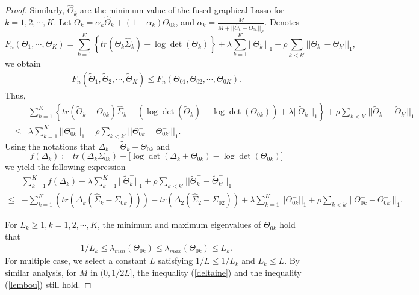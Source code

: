 \documentclass[review]{elsarticle}
\newcommand{\1}{{\bf 1}}
\newcommand{\0}{{\bf 0}}
\newcommand{\bqa}{\begin{eqnarray}}
\newcommand{\eqa}{\end{eqnarray}}
\newcommand{\non}{\nonumber\\}
\newtheorem{proof}{Proof}
\begin{document}
\begin{appendices}
\begin{proof}
 Similarly, $\widehat{\Theta}_k$ are the minimum value of the fused graphical Lasso for $k=1,2,\cdots,K$. Let $\widetilde{\Theta}_k=\alpha_k\widehat{\Theta}_k+(1-\alpha_k)\Theta_{0k}$, and $\alpha_k=\frac{M}{M+||\widehat{\Theta}_k-\Theta_{0k}||_{F}}$.
 Denotes
 $$F_n(\Theta_1,\cdots,\Theta_K)=\sum_{k=1}^{K}\left\{tr(\Theta_k\widehat{\Sigma}_k)-\log\det(\Theta_k)\right\}
 +\lambda\sum_{k=1}^{K}||\Theta_k^{-}||_1+\rho\sum_{k<k'}||\Theta_k^{-}-\Theta_{k'}^{-}||_1,$$ we obtain
\bqa
F_n(\widetilde\Theta_1,\widetilde\Theta_2,\cdots,\widetilde\Theta_K)\leq F_n(\Theta_{01},\Theta_{02},\cdots,\Theta_{0K}).
\eqa
 Thus,
\bqa\label{convexFGL}
&&\sum_{k=1}^{K}\left\{tr(\widetilde{\Theta}_k-\Theta_{0k})\widehat{\Sigma}_k-\left(\log \det(\widetilde{\Theta}_k)-\log\det(\Theta_{0k})\right)
+\lambda||\widetilde{\Theta}^{-}_k||_{1}\right\}
+\rho\sum_{k<k'}||\widetilde{\Theta}_k^{-}-\widetilde{\Theta}_{k'}^{-}||_1\ \non
&\leq& \lambda\sum_{k=1}^{K}||\Theta^{-}_{0k}||_{1}
+\rho\sum_{k<k'}||\Theta_{0k}^{-}-\Theta_{0k'}^{-}||_1.
\eqa
 Using the notations that $\Delta_k=\widetilde{\Theta}_k-\Theta_{0k}$ and $$f(\Delta_k):=tr(\Delta_k\Sigma_{0k})-\Big[\log\det(\Delta_k+\Theta_{0k})-\log\det(\Theta_{0k})\Big]$$ we yield the following expression
\begin{equation}\label{equ12FGL}
\begin{aligned}
&\sum_{k=1}^{K}f(\Delta_k)+\lambda\sum_{k=1}^{K}||\widetilde{\Theta}_k^{-}||_1
+\rho\sum_{k<k'}||\widetilde{\Theta}_k^{-}-\widetilde{\Theta}_{k'}^{-}||_1\\
\leq &-\sum_{k=1}^{K}\left(tr(\Delta_k(\widehat{\Sigma}_k-\Sigma_{0k}))\right)
-tr(\Delta_2(\widehat{\Sigma}_2-\Sigma_{02}))+
\lambda\sum_{k=1}^{K}||\Theta_{0k}^{-}||_1
+\rho\sum_{k<k'}||\Theta_{0k}^{-}-\Theta_{0k'}^{-}||_1.
\end{aligned}
\end{equation}

 For $L_k\geq 1,k=1,2,\cdots,K$, the minimum and maximum eigenvalues of $\Theta_{0k}$ hold that
\bqa
1/L_k\leq \lambda_{min}(\Theta_{0k})\leq \lambda_{max}(\Theta_{0k})\leq L_k.
\eqa
 For multiple case, we select a constant $L$ satisfying $1/L\leq 1/L_k$ and $L_k\leq L$.
 By similar analysis, for $M$ in $(0,1/2L]$, the inequality (\ref{deltaine}) and the inequality (\ref{lembou}) still hold.


\end{proof}
\end{appendices}
\end{document}

